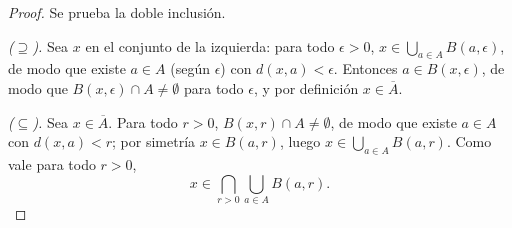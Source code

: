 \documentclass[11pt, a4paper]{article}
\begin{document}
\begin{proof}
Se prueba la doble inclusión.

\textit{($\supseteq$).} Sea $x$ en el conjunto de la izquierda: para todo $\epsilon > 0$,
$x \in \bigcup_{a \in A} B(a, \epsilon)$, de modo que existe $a \in A$ (según $\epsilon$) con
$d(x, a) < \epsilon$. Entonces $a \in B(x, \epsilon)$, de modo que
$B(x, \epsilon) \cap A \neq \emptyset$ para todo $\epsilon$, y por definición $x \in \overline{A}$.

\textit{($\subseteq$).} Sea $x \in \overline{A}$. Para todo $r > 0$, $B(x, r) \cap A \neq \emptyset$,
de modo que existe $a \in A$ con $d(x, a) < r$; por simetría $x \in B(a, r)$, luego
$x \in \bigcup_{a \in A} B(a, r)$. Como vale para todo $r > 0$,
$$ x \in \bigcap_{r>0} \bigcup_{a \in A} B(a,r). $$
\end{proof}
\end{document}
